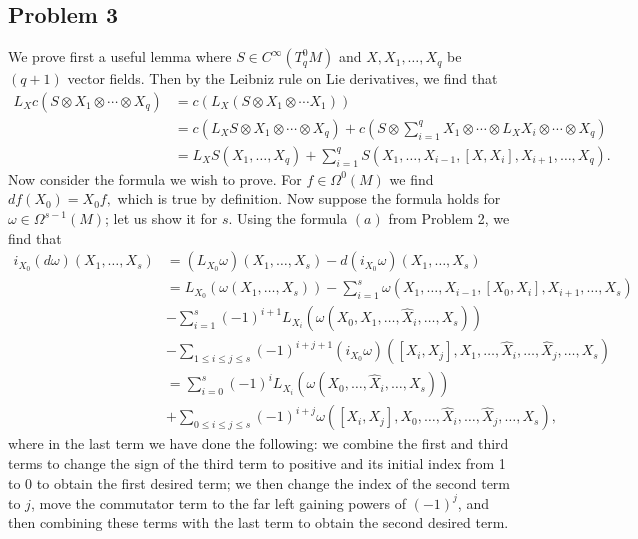 \documentclass{../mathnotes}
\begin{document}
\subsection*{Problem 3}
We prove first a useful lemma where $S\in C^\infty(T^0_qM)$ and $X,X_1,\ldots,X_q$ be $(q+1)$ vector fields.
Then by the Leibniz rule on Lie derivatives, we find that
\begin{align*}
    L_Xc(S\otimes X_1\otimes\cdots \otimes X_q) &= c(L_X(S\otimes X_1\otimes \cdots X_1))\\
    &= c(L_XS\otimes X_1\otimes \cdots \otimes X_q) + c(S\otimes \sum_{i=1}^q X_1\otimes \cdots\otimes L_XX_i\otimes \cdots \otimes X_q)\\
    &=L_XS(X_1,\ldots,X_q) + \sum_{i=1}^q S(X_1,\ldots, X_{i-1},[X,X_i], X_{i+1}, \ldots ,X_q).
\end{align*}
Now consider the formula we wish to prove. For $f\in\Omega^0(M)$ we find $df(X_0)=X_0f,$ which is true
by definition. Now suppose the formula holds for $\omega\in\Omega^{s-1}(M)$; let us show it for $s$.
Using the formula $(a)$ from Problem 2, we find that
\begin{align*}
    i_{X_0}(d\omega)(X_1,\ldots, X_s) &= (L_{X_0}\omega)(X_1,\ldots,X_s)-d(i_{X_0}\omega)(X_1,\ldots,X_s)\\
    &= L_{X_0}(\omega(X_1,\ldots,X_s))-\sum_{i=1}^s\omega(X_1,\ldots,X_{i-1},[X_0,X_i],X_{i+1},\ldots,X_s)\\
    &- \sum_{i=1}^s(-1)^{i+1}L_{X_i}(\omega(X_0,X_1,\ldots,\hat X_i,\ldots,X_s))\\
    &-\sum_{1\leq i\leq j\leq s}(-1)^{i+j+1}(i_{X_0}\omega)([X_i,X_j],X_1,\ldots,\hat X_i,\ldots,\hat X_j,\ldots,X_s)\\
    &=\sum_{i=0}^s(-1)^iL_{X_i}(\omega(X_0,\ldots,\hat X_i,\ldots,X_s))\\
    &+\sum_{0\leq i\leq j\leq s}(-1)^{i+j}\omega([X_i,X_j],X_0,\ldots,\hat X_i,\ldots,\hat X_j,\ldots,X_s),
\end{align*}
where in the last term we have done the following: we combine the first and third terms to change the
sign of the third term to positive and its initial index from 1 to 0 to obtain the first desired term;
we then change the index of the second term to $j$, move the commutator term to the far left gaining
powers of $(-1)^j$, and then combining these terms with the last term to obtain the second desired term.
\end{document}
